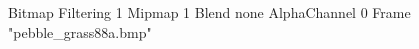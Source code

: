 {Bitmap
	{Filtering 1}
	{Mipmap 1}
	{Blend none}
	{AlphaChannel 0}
	{Frame "pebble_grass88a.bmp"}
}
